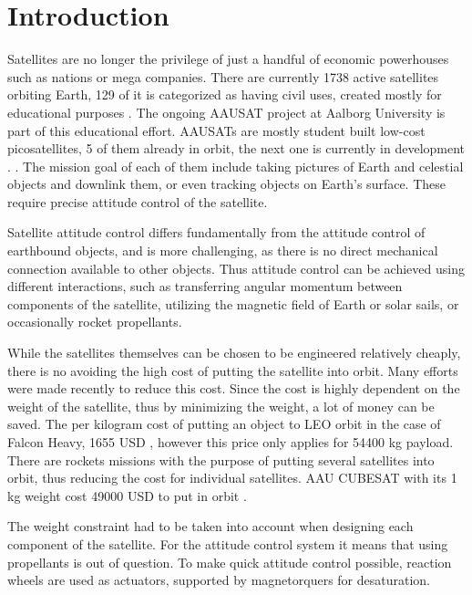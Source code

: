 \chapter{Introduction}\label{chap:Introduction}

Satellites are no longer the privilege of just a handful of economic powerhouses such as nations or mega companies. There are currently 1738 active satellites orbiting Earth, 129 of it is categorized as having civil uses, created mostly for educational purposes \cite{SatSummary}. The ongoing AAUSAT project at Aalborg University is part of this educational effort. AAUSATs are mostly student built low-cost picosatellites, 5 of them already in orbit, the next one is currently in development \cite{aausatsite}. . The mission goal of each of them include taking pictures of Earth and celestial objects and downlink them, or even tracking objects on Earth's surface. These require precise attitude control of the satellite. 

Satellite attitude control differs fundamentally from the attitude control of earthbound objects, and is more challenging, as there is no direct mechanical connection available to other objects. Thus attitude control can be achieved using different interactions, such as transferring angular momentum between components of the satellite, utilizing the magnetic field of Earth or solar sails, or occasionally rocket propellants.

 While the satellites themselves can be chosen to be engineered relatively cheaply, there is no avoiding the high cost of putting the satellite into orbit. Many efforts were made recently to reduce this cost.  Since the cost is highly dependent on the weight of the satellite, thus by minimizing the weight, a lot of money can be saved. The per kilogram cost of putting an object to LEO orbit in the case of Falcon Heavy, 1655 USD \cite{spaceX}, however this price only applies for 54400 kg payload. There are rockets missions with the purpose of putting several satellites into orbit, thus reducing the cost for individual satellites. AAU CUBESAT with its 1 kg weight cost 49000 USD to put in orbit \cite{AAUSATpres}.
 
 The weight constraint had to be taken into account when designing each component of the satellite. For the attitude control system it means that using propellants is out of question. To make quick attitude control possible, reaction wheels are used as actuators, supported by magnetorquers for desaturation. 
 
